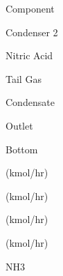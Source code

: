 \documentclass[a4paper,portrait,12pt]{article}
\begin{document}
\begin{flushleft}
Component
\end{flushleft}





\begin{flushleft}
Condenser 2
\end{flushleft}





\begin{flushleft}
Nitric Acid
\end{flushleft}


\begin{flushleft}
Tail Gas
\end{flushleft}





\begin{flushleft}
Condensate
\end{flushleft}


\begin{flushleft}
Outlet
\end{flushleft}





\begin{flushleft}
Bottom
\end{flushleft}


\begin{flushleft}
(kmol/hr)
\end{flushleft}





\begin{flushleft}
(kmol/hr)
\end{flushleft}





\begin{flushleft}
(kmol/hr)
\end{flushleft}





\begin{flushleft}
(kmol/hr)
\end{flushleft}


\begin{flushleft}
NH3
\end{flushleft}
\end{document}
